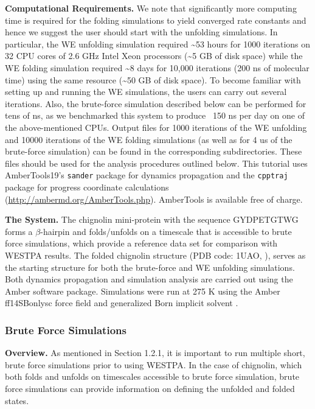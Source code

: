 \documentclass[9pt,tutorial,ASAPversion]{livecoms}
\begin{document}
\textbf{Computational Requirements.} We note that significantly more computing time is required for the folding simulations to yield converged rate constants and hence we suggest the user should start with the unfolding simulations. 
In particular, the WE unfolding simulation required \textasciitilde 53 hours for 1000 iterations on 32 CPU cores of 2.6 GHz Intel Xeon processors (\textasciitilde 5 GB of disk space) while the WE folding simulation required \textasciitilde 8 days for 10,000 iterations (200 ns of molecular time) using the same resource (\textasciitilde 50 GB of disk space).
To become familiar with setting up and running the WE simulations, the users can carry out several iterations.  Also, the brute-force simulation described below can be performed for tens of ns, as we benchmarked this system to produce ~150 ns per day on one of the above-mentioned CPUs. Output files for 1000 iterations of the WE unfolding and 10000 iterations of the WE folding simulations (as well as for 4 us of the brute-force simulation) can be found in the corresponding subdirectories. These files should be used for the analysis procedures outlined below.
This tutorial uses AmberTools19’s \verb|sander| package for dynamics propagation and the  \verb|cpptraj| package for progress coordinate calculations (\url{http://ambermd.org/AmberTools.php}). AmberTools is available free of charge.

\textbf{The System.} The chignolin mini-protein with the sequence GYDPETGTWG forms a $\beta$-hairpin and folds/unfolds on a timescale that is accessible to brute force simulations, which provide a reference data set for comparison with WESTPA results. 
The folded chignolin structure (PDB code: 1UAO, \citep{Honda2004}), serves as the starting structure for both the brute-force and WE unfolding simulations. 
Both dynamics propagation and simulation analysis are carried out using the Amber software package. 
Simulations were run at 275 K using the Amber ff14SBonlysc force field \citep{ff} and generalized Born implicit solvent \citep{implicit_solvent}. 

\subsubsection{Brute Force Simulations}

\textbf{Overview.} As mentioned in Section 1.2.1, it is important to run multiple short, brute force simulations prior to using WESTPA. 
In the case of chignolin, which both folds and unfolds on timescales accessible to brute force simulation, brute force simulations can provide information on defining the unfolded and folded states. 
 
\end{document}
